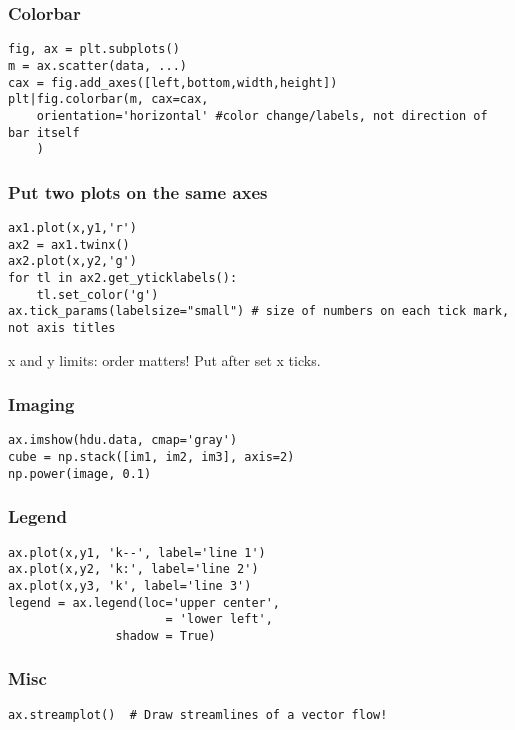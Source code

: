\documentclass{article}
\begin{document}
\begin{multicols}{2}
\newpage
\subsubsection{Colorbar}
\begin{lstlisting}
fig, ax = plt.subplots()
m = ax.scatter(data, ...)
cax = fig.add_axes([left,bottom,width,height])
plt|fig.colorbar(m, cax=cax,
    orientation='horizontal' #color change/labels, not direction of bar itself
    )
\end{lstlisting}

\subsubsection{Put two plots on the same axes}
\begin{lstlisting}
ax1.plot(x,y1,'r')
ax2 = ax1.twinx()
ax2.plot(x,y2,'g')
for tl in ax2.get_yticklabels():
    tl.set_color('g')
ax.tick_params(labelsize="small") # size of numbers on each tick mark, not axis titles
\end{lstlisting}
x and y limits: order matters! Put after set x ticks.

\subsubsection{Imaging}
\begin{lstlisting}
ax.imshow(hdu.data, cmap='gray')
cube = np.stack([im1, im2, im3], axis=2)
np.power(image, 0.1)
\end{lstlisting}

\subsubsection{Legend}
\begin{lstlisting}
ax.plot(x,y1, 'k--', label='line 1')
ax.plot(x,y2, 'k:', label='line 2')
ax.plot(x,y3, 'k', label='line 3')
legend = ax.legend(loc='upper center',
                      = 'lower left',
               shadow = True)
\end{lstlisting}

\subsubsection{Misc}
\begin{lstlisting}
ax.streamplot()  # Draw streamlines of a vector flow!
\end{lstlisting}
\end{multicols}

\restoregeometry
\end{document}
